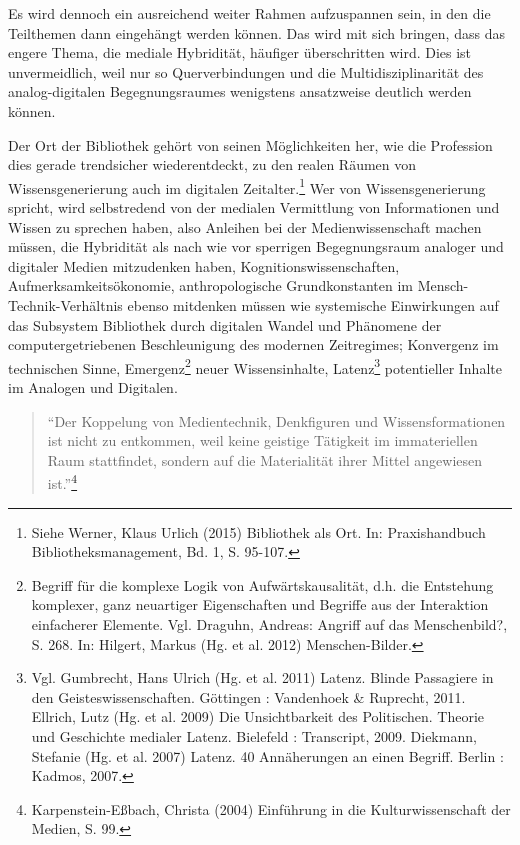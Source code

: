 \documentclass[a4paper,
fontsize=11pt,
oneside,
numbers=noperiodatend,
parskip=half-,
bibliography=totoc,
final
]{scrartcl}
\begin{document}
Es wird dennoch ein ausreichend weiter Rahmen aufzuspannen sein, in den
die Teilthemen dann eingehängt werden können. Das wird mit sich bringen,
dass das engere Thema, die mediale Hybridität, häufiger überschritten
wird. Dies ist unvermeidlich, weil nur so Querverbindungen und die
Multidisziplinarität des analog-digitalen Begegnungsraumes wenigstens
ansatzweise deutlich werden können.

Der Ort der Bibliothek gehört von seinen Möglichkeiten her, wie die
Profession dies gerade trendsicher wiederentdeckt, zu den realen Räumen
von Wissensgenerierung auch im digitalen Zeitalter.\footnote{Siehe
  Werner, Klaus Urlich (2015) Bibliothek als Ort. In: Praxishandbuch
  Bibliotheksmanagement, Bd. 1, S. 95-107.} Wer von Wissensgenerierung
spricht, wird selbstredend von der medialen Vermittlung von
Informationen und Wissen zu sprechen haben, also Anleihen bei der
Medienwissenschaft machen müssen, die Hybridität als nach wie vor
sperrigen Begegnungsraum analoger und digitaler Medien mitzudenken
haben, Kognitionswissenschaften, Aufmerksamkeitsökonomie,
anthropologische Grundkonstanten im Mensch-Technik-Verhältnis ebenso
mitdenken müssen wie systemische Einwirkungen auf das Subsystem
Bibliothek durch digitalen Wandel und Phänomene der computergetriebenen
Beschleunigung des modernen Zeitregimes; Konvergenz im technischen
Sinne, Emergenz\footnote{Begriff für die komplexe Logik von
  Aufwärtskausalität, d.h. die Entstehung komplexer, ganz neuartiger
  Eigenschaften und Begriffe aus der Interaktion einfacherer Elemente.
  Vgl. Draguhn, Andreas: Angriff auf das Menschenbild?, S. 268. In:
  Hilgert, Markus (Hg. et al. 2012) Menschen-Bilder.} neuer
Wissensinhalte, Latenz\footnote{Vgl. Gumbrecht, Hans Ulrich (Hg. et al.
  2011) Latenz. Blinde Passagiere in den Geisteswissenschaften.
  Göttingen : Vandenhoek \& Ruprecht, 2011. Ellrich, Lutz (Hg. et al.
  2009) Die Unsichtbarkeit des Politischen. Theorie und Geschichte
  medialer Latenz. Bielefeld : Transcript, 2009. Diekmann, Stefanie (Hg.
  et al. 2007) Latenz. 40 Annäherungen an einen Begriff. Berlin :
  Kadmos, 2007.} potentieller Inhalte im Analogen und Digitalen.

\begin{quote}
\enquote{Der Koppelung von Medientechnik, Denkfiguren und
Wissensformationen ist nicht zu entkommen, weil keine geistige Tätigkeit
im immateriellen Raum stattfindet, sondern auf die Materialität ihrer
Mittel angewiesen ist.}\footnote{Karpenstein-Eßbach, Christa (2004)
  Einführung in die Kulturwissenschaft der Medien, S. 99.}
\end{quote}
\end{document}
